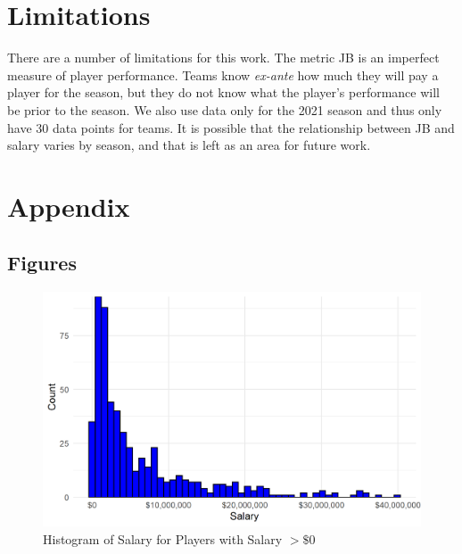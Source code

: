 \documentclass{article}
\begin{document}
\section{Limitations}

There are a number of limitations for this work. The metric JB is an imperfect measure of player performance. Teams know \emph{ex-ante} how much they will pay a player for the season, but they do not know what the player's performance will be prior to the season. We also use data only for the 2021 season and thus only have 30 data points for teams. It is possible that the relationship between JB and salary varies by season, and that is left as an area for future work. 

\newpage




\newpage

\section{Appendix}

\subsection{Figures}

\begin{figure}[h]
\caption{Histogram of Salary for Players with Salary $> \$0$}
\label{fig:salary_hist}
\centering
\includegraphics[width=0.7\paperwidth, scale=1.25]{salary_hist.png}
\end{figure}
\end{document}
